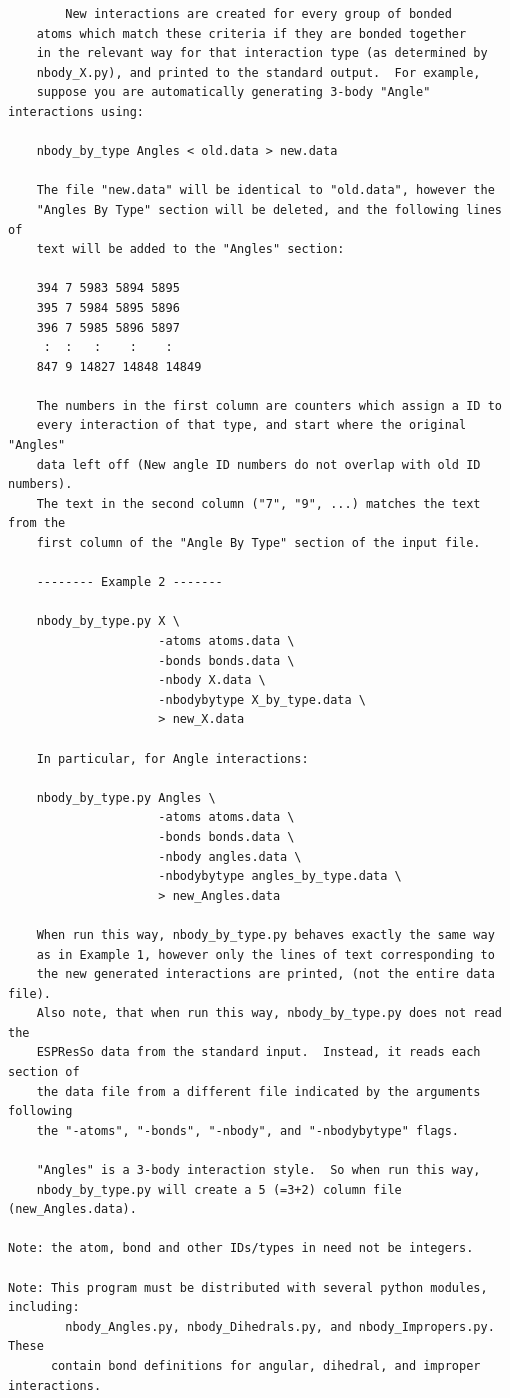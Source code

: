 \documentclass[11pt]{article}
\begin{document}
\begin{verbatim}
        New interactions are created for every group of bonded 
    atoms which match these criteria if they are bonded together 
    in the relevant way for that interaction type (as determined by
    nbody_X.py), and printed to the standard output.  For example, 
    suppose you are automatically generating 3-body "Angle" interactions using:

    nbody_by_type Angles < old.data > new.data

    The file "new.data" will be identical to "old.data", however the
    "Angles By Type" section will be deleted, and the following lines of
    text will be added to the "Angles" section:

    394 7 5983 5894 5895
    395 7 5984 5895 5896
    396 7 5985 5896 5897
     :  :   :    :    :
    847 9 14827 14848 14849

    The numbers in the first column are counters which assign a ID to 
    every interaction of that type, and start where the original "Angles"
    data left off (New angle ID numbers do not overlap with old ID numbers).
    The text in the second column ("7", "9", ...) matches the text from the 
    first column of the "Angle By Type" section of the input file.

    -------- Example 2 -------

    nbody_by_type.py X \
                     -atoms atoms.data \
                     -bonds bonds.data \
                     -nbody X.data \
                     -nbodybytype X_by_type.data \
                     > new_X.data

    In particular, for Angle interactions:

    nbody_by_type.py Angles \
                     -atoms atoms.data \
                     -bonds bonds.data \
                     -nbody angles.data \
                     -nbodybytype angles_by_type.data \
                     > new_Angles.data

    When run this way, nbody_by_type.py behaves exactly the same way
    as in Example 1, however only the lines of text corresponding to
    the new generated interactions are printed, (not the entire data file).
    Also note, that when run this way, nbody_by_type.py does not read the
    ESPResSo data from the standard input.  Instead, it reads each section of
    the data file from a different file indicated by the arguments following
    the "-atoms", "-bonds", "-nbody", and "-nbodybytype" flags.

    "Angles" is a 3-body interaction style.  So when run this way, 
    nbody_by_type.py will create a 5 (=3+2) column file (new_Angles.data).

Note: the atom, bond and other IDs/types in need not be integers.

Note: This program must be distributed with several python modules, including:
        nbody_Angles.py, nbody_Dihedrals.py, and nbody_Impropers.py.  These
      contain bond definitions for angular, dihedral, and improper interactions.
\end{verbatim}
\end{document}
